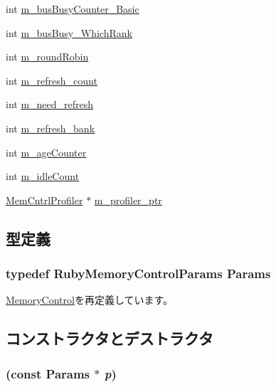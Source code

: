 \begin{DoxyCompactItemize}
int \hyperlink{classRubyMemoryControl_a9622fd6ccdf6aaac725dd5b199651e1f}{m\_\-busBusyCounter\_\-Basic}
\item 
int \hyperlink{classRubyMemoryControl_a0889f6b503357c0dee9ca27b3a777a61}{m\_\-busBusy\_\-WhichRank}
\item 
int \hyperlink{classRubyMemoryControl_ae91016ac7543fa2d2e4fc5ba9748a134}{m\_\-roundRobin}
\item 
int \hyperlink{classRubyMemoryControl_a11c845239e7ec76861ae230df7a575b2}{m\_\-refresh\_\-count}
\item 
int \hyperlink{classRubyMemoryControl_a81b8cb5d4100808f5d49ebb9e7f878bd}{m\_\-need\_\-refresh}
\item 
int \hyperlink{classRubyMemoryControl_a93843e73be2e39683d2b6ce21c8a6298}{m\_\-refresh\_\-bank}
\item 
int \hyperlink{classRubyMemoryControl_aba1d5e3376d7d3bed53b2bafcd056c64}{m\_\-ageCounter}
\item 
int \hyperlink{classRubyMemoryControl_a1b496ca0cf94387967ed0539a43fb126}{m\_\-idleCount}
\item 
\hyperlink{classMemCntrlProfiler}{MemCntrlProfiler} $\ast$ \hyperlink{classRubyMemoryControl_a1f70f7199575ca8bd58b685a72c37f84}{m\_\-profiler\_\-ptr}
\end{DoxyCompactItemize}


\subsection{型定義}
\hypertarget{classRubyMemoryControl_af43d4e91847a2856227bcb75a70a9a86}{
\subsubsection[{Params}]{\setlength{\rightskip}{0pt plus 5cm}typedef RubyMemoryControlParams {\bf Params}}}
\label{classRubyMemoryControl_af43d4e91847a2856227bcb75a70a9a86}


\hyperlink{classMemoryControl_aec6d67eaecba2a2311edc4c4c78fb0f5}{MemoryControl}を再定義しています。

\subsection{コンストラクタとデストラクタ}
\hypertarget{classRubyMemoryControl_a4f3e4d7624fbb425e553c4e36cadcba9}{
\subsubsection[{RubyMemoryControl}]{ (const {\bf Params} $\ast$ {\em p})}}
\label{classRubyMemoryControl_a4f3e4d7624fbb425e553c4e36cadcba9}



